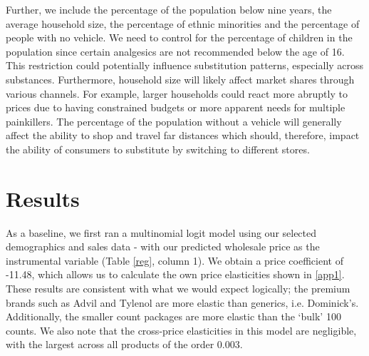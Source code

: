 \documentclass[12pt, authoryear]{elsarticle}
\begin{document}
Further, we include the percentage of the population below nine years, the average household size, the percentage of ethnic minorities and the percentage of people with no vehicle. We need to control for the percentage of children in the population since certain analgesics are not recommended below the age of 16. This restriction could potentially influence substitution patterns, especially across substances. Furthermore, household size will likely affect market shares through various channels. For example, larger households could react more abruptly to prices due to having constrained budgets or more apparent needs for multiple painkillers. The percentage of the population without a vehicle will generally affect the ability to shop and travel far distances which should, therefore, impact the ability of consumers to substitute by switching to different stores. 

\section{Results}\label{results}

As a baseline, we first ran a multinomial logit model using our selected demographics and sales data - with our predicted wholesale price as the instrumental variable (Table \ref{reg}, column 1).  We obtain a price coefficient of -11.48, which allows us to calculate the own price elasticities shown in \ref{app1}.  These results are consistent with what we would expect logically; the premium brands such as Advil and Tylenol are more elastic than generics, i.e. Dominick’s.  Additionally, the smaller count packages are more elastic than the ‘bulk’ 100 counts.  We also note that the cross-price elasticities in this model are negligible, with the largest across all products of the order 0.003. 
\end{document}
